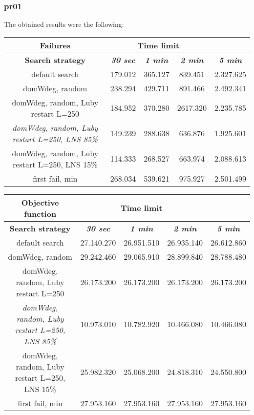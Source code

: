 \subsubsection{pr01}
The obtained results were the following:
{
\renewcommand{\arraystretch}{2}
\begin{longtable}[h]{| c | c | c | c | c |}
    \hline
    \textbf{Failures} & \multicolumn{3}{c}{Time limit} & \\
    \hline
    \textbf{Search strategy} & \textbf{\textit{30 sec}} & \textbf{\textit{1 min}} & \textbf{\textit{2 min}} & \textbf{\textit{5 min}} \\
    \hline
    \endhead
    default search                                         & 179.012 & 365.127 &  839.451 & 2.327.625 \\
    \hline
    domWdeg, random                                        & 238.294 & 429.711 &  891.466 & 2.492.341 \\
    \hline
    domWdeg, random, Luby restart L=250                    & 184.952 & 370.280 & 2617.320 & 2.235.785 \\
    \hline
    \textit{domWdeg, random, Luby restart L=250, LNS 85\%} & 149.239 & 288.638 &  636.876 & 1.925.601 \\
    \hline
    domWdeg, random, Luby restart L=250, LNS 15\%          & 114.333 & 268.527 &  663.974 & 2.088.613 \\
    \hline
    first fail, min                                        & 268.034 & 539.621 &  975.927 & 2.501.499 \\
    \hline
\end{longtable}
}

{
\renewcommand{\arraystretch}{2}
\begin{longtable}[h]{| c | c | c | c | c |}
    \hline
    \textbf{Objective function} & \multicolumn{3}{c}{Time limit} & \\
    \hline
    \textbf{Search strategy} & \textbf{\textit{30 sec}} & \textbf{\textit{1 min}} & \textbf{\textit{2 min}} & \textbf{\textit{5 min}} \\
    \hline
    \endhead
    default search                                         & 27.140.270 & 26.951.510 & 26.935.140 & 26.612.860 \\
    \hline
    domWdeg, random                                        & 29.242.460 & 29.065.910 & 28.899.840 & 28.788.480 \\
    \hline
    domWdeg, random, Luby restart L=250                    & 26.173.200 & 26.173.200 & 26.173.200 & 26.173.200 \\
    \hline
    \textit{domWdeg, random, Luby restart L=250, LNS 85\%} & 10.973.010 & 10.782.920 & 10.466.080 & 10.466.080 \\
    \hline
    domWdeg, random, Luby restart L=250, LNS 15\%          & 25.982.320 & 25.068.200 & 24.818.310 & 24.550.800 \\
    \hline
    first fail, min                                        & 27.953.160 & 27.953.160 & 27.953.160 & 27.953.160 \\
    \hline
\end{longtable}
}

